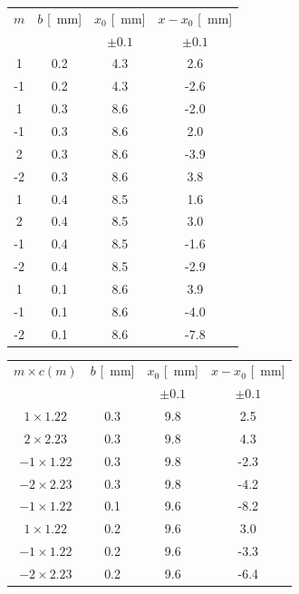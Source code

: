 \documentclass[10pt,oneside,a4paper]{article}
\begin{document}
\begin{minipage}[t]{.5\linewidth}
\vspace{0cm}
\begin{center}
\label{tab:misuraLambda1}
\begin{tabular}{c|c|c|c}
$m$ & $b$ [\SI{}{mm}] & $x_0$ [\SI{}{mm}] & $x-x_0$ [\SI{}{mm}]\\
 & & $\pm 0.1$ & $\pm 0.1$\\
\hline
  1 & 0.2 & 4.3 &  2.6 \\
 -1 & 0.2 & 4.3 & -2.6 \\
  1 & 0.3 & 8.6 & -2.0 \\
 -1 & 0.3 & 8.6 &  2.0 \\
  2 & 0.3 & 8.6 & -3.9 \\
 -2 & 0.3 & 8.6 &  3.8 \\
  1 & 0.4 & 8.5 &  1.6 \\
  2 & 0.4 & 8.5 &  3.0 \\
 -1 & 0.4 & 8.5 & -1.6 \\
 -2 & 0.4 & 8.5 & -2.9 \\
  1 & 0.1 & 8.6 &  3.9 \\
 -1 & 0.1 & 8.6 & -4.0 \\
 -2 & 0.1 & 8.6 & -7.8 \\
\hline
\end{tabular}
\end{center}
\end{minipage}
\quad
\begin{minipage}[t]{.5\linewidth}
\vspace{0cm}
\begin{center}
\label{tab:misuraLambda2}
\begin{tabular}{c|c|c|c}
$m \times c(m)$ & $b$ [\SI{}{mm}] & $x_0$ [\SI{}{mm}] & $x-x_0$ [\SI{}{mm}]\\
 & & $\pm 0.1$ & $\pm 0.1$\\
\hline
  $1 \times 1.22$ & 0.3 & 9.8 &  2.5 \\
  $2 \times 2.23$ & 0.3 & 9.8 &  4.3 \\
 $-1 \times 1.22$ & 0.3 & 9.8 & -2.3 \\
 $-2 \times 2.23$ & 0.3 & 9.8 & -4.2 \\
 $-1 \times 1.22$ & 0.1 & 9.6 & -8.2 \\
 $1 \times 1.22$ & 0.2 & 9.6 &  3.0 \\
 $-1 \times 1.22$ & 0.2 & 9.6 & -3.3 \\
 $-2 \times 2.23$ & 0.2 & 9.6 & -6.4 \\
\hline
\end{tabular}
\end{center}
\end{minipage}
\end{document}
